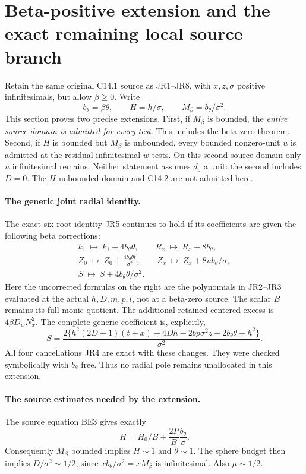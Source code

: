 \section{Beta-positive extension and the exact remaining local source branch}
\label{sec:r13-beta-positive-extension}

Retain the same original C14.1 source as JR1--JR8, with $x,z,\sigma$
positive infinitesimals, but allow $\beta\ge0$. Write
\[
 b_\theta=\beta\theta,\qquad H=h/\sigma,\qquad
 M_\beta=b_\theta/\sigma^2.
\]
This section proves two precise extensions. First, if $M_\beta$ is
bounded, the \emph{entire source domain is admitted for every test}.
This includes the beta-zero theorem. Second, if $H$ is bounded but
$M_\beta$ is unbounded, every bounded nonzero-unit $u$ is admitted
at the residual infinitesimal-$w$ tests. On this second source domain
only $u$ infinitesimal remains. Neither statement assumes $d_0$ a
unit: the second includes $D=0$. The $H$-unbounded domain and C14.2
are not admitted here.

\paragraph{The generic joint radial identity.}
The exact six-root identity JR5 continues to hold if its coefficients
are given the following beta corrections:
\begin{gather*}
 k_1\ \mapsto\ k_1+4b_\theta\theta,\qquad
 R_x\ \mapsto\ R_x+8b_\theta,\\
 Z_0\ \mapsto\ Z_0+\frac{4b_\theta\theta t}{\sigma^2},\qquad
 Z_x\ \mapsto\ Z_x+8ub_\theta/\sigma,\\
 S\ \mapsto\ S+4b_\theta\theta/\sigma^2.
\tag{JB1}
\end{gather*}
Here the uncorrected formulas on the right are the polynomials in
JR2--JR3 evaluated at the actual $h,D,m,p,l$, not at a beta-zero
source. The scalar $B$ remains its full monic quotient. The additional
retained centered excess is $4\beta D_wN_x^2$. The complete generic
coefficient is, explicitly,
\[
 S=\frac{2\{h^2(2D+1)(t+x)+4Dh-2bp\sigma^2z
                       +2b_\theta\theta+h^2\}}{\sigma^2}.
\tag{JB2}
\]
All four cancellations JR4 are exact with these changes. They were
checked symbolically with $b_\theta$ free. Thus no radial pole remains
unallocated in this extension.

\paragraph{The source estimates needed by the extension.}
The source equation BE3 gives exactly
\[
 H=H_0/B+\frac{2P}{B}\frac{b_\theta}{\sigma}.
\tag{JB3}
\]
Consequently $M_\beta$ bounded implies $H\sim1$ and $\theta\sim1$.
The sphere budget then implies $D/\sigma^2\sim1/2$, since
$xb_\theta/\sigma^2=xM_\beta$ is infinitesimal. Also $\mu\sim1/2$.

